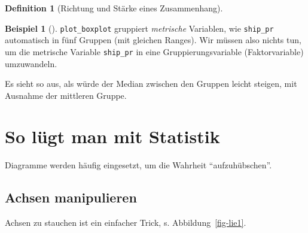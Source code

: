 \documentclass[
  a4paper,
  DIV=11]{scrreprt}
\theoremstyle{definition}
\theoremstyle{definition}
\newtheorem{example}{Beispiel}[chapter]
\theoremstyle{definition}
\newtheorem{definition}{Definition}[chapter]
\theoremstyle{remark}
\begin{document}
\begin{definition}[Richtung und Stärke eines
Zusammenhang]
\begin{example}[]
\texttt{plot\_boxplot} gruppiert \emph{metrische} Variablen, wie
\texttt{ship\_pr} automatisch in fünf Gruppen (mit gleichen Ranges). Wir
müssen also nichts tun, um die metrische Variable \texttt{ship\_pr} in
eine Gruppierungsvariable (Faktorvariable) umzuwandeln.

Es sieht so aus, als würde der Median zwischen den Gruppen leicht
steigen, mit Ausnahme der mittleren Gruppe.

\end{example}

\section{So lügt man mit Statistik}\label{so-luxfcgt-man-mit-statistik}

Diagramme werden häufig eingesetzt, um die Wahrheit ``aufzuhübschen''.

\subsection{Achsen manipulieren}\label{achsen-manipulieren}

Achsen zu stauchen ist ein einfacher Trick, s. Abbildung~\ref{fig-lie1}.

\begin{figure}

\begin{minipage}{0.50\linewidth}

\end{minipage}
\end{figure}
\end{definition}
\end{document}
